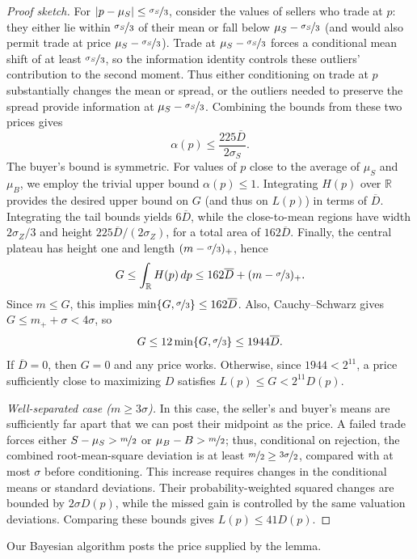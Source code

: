 \documentclass[11pt]{article}
\newcommand{\R}{\mathbb R}
\begin{document}
\begin{proof}[Proof sketch]
    For $|p-\mu_S|\le\nicefrac{\sigma_S}3$, consider the {values of sellers who trade} at $p$: they either lie within $\nicefrac{\sigma_S}3$ {of their mean or fall below} $\mu_S-\nicefrac{\sigma_S}3$ ({and would also permit trade at price} $\mu_S-\nicefrac{\sigma_S}3$). Trade at $\mu_S-\nicefrac{\sigma_S}3$ forces a conditional mean shift of at least $\nicefrac{\sigma_S}3$, so the information identity controls these outliers' contribution to the second moment. Thus either conditioning on trade at $p$ substantially changes the mean or spread, or the outliers needed to preserve the spread provide information at $\mu_S-\nicefrac{\sigma_S}3$. Combining the bounds from these two prices gives
\[
 \alpha(p)\le\frac{225\overline D}{2\sigma_S}. \tag{Close-to-mean Bound}
\]
The buyer's bound is symmetric.
For values of $p$ close to the average of $\mu_S$ and $\mu_B$, we employ the trivial upper bound $\alpha(p) \le 1.$ Integrating $H(p)$ over $\R$ provides the desired upper bound on $G$ (and thus on $L(p)$) in terms of $\overline D$. Integrating the tail bounds {yields} $6\overline D$, while the close-to-mean regions have width $2\sigma_Z/3$ and height $225\overline D/(2\sigma_Z)$, for a total area of $162\overline D$. Finally, the central plateau has height one and length $(m-\nicefrac{\sigma}3)_+$, hence
\[
 G\le\int_{\R}H(p)\,dp
 \le162\overline D+(m-\nicefrac{\sigma}3)_+.
\]
Since $m\le G$, this implies $\min\{G,\nicefrac{\sigma}3\}\le162\overline D$. Also, Cauchy--Schwarz gives $G\le m_++\sigma<4\sigma$, so
\[
 G\le12\min\{G,\nicefrac{\sigma}3\}\le1944\overline D.
\]
If $\overline D=0$, then $G=0$ and any price works. Otherwise, since $1944<2^{11}$, a price sufficiently close to maximizing $D$ satisfies $L(p)\le G<2^{11}D(p)$.

\emph{Well-separated case ($m\ge3\sigma$).} In this case, {the seller's and buyer's means are sufficiently far apart that we can post their midpoint as the price.} A failed trade forces
either
$S-\mu_S>\nicefrac{m}2$ or $\mu_B-B>\nicefrac{m}2$; thus, conditional on rejection, the combined root-mean-square deviation is at least $\nicefrac{m}2\ge\nicefrac{3\sigma}2$, compared with at most $\sigma$ before conditioning. This increase requires changes in the conditional means or standard deviations. Their probability-weighted squared changes are bounded by $2\sigma D(p)$, while the missed gain is controlled by the same valuation deviations. Comparing these bounds gives
$L(p)\le41D(p)$.
\end{proof}

    {Our Bayesian algorithm posts the price supplied by the lemma.} 
\end{document}

